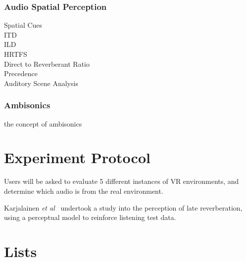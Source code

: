 \documentclass[paper=a4, fontsize=10pt, font=arial]{scrartcl} %
\numberwithin{equation}{section} %
\numberwithin{figure}{section} %
\numberwithin{table}{section} %
\begin{document}
\subsubsection{Audio Spatial Perception}

Spatial Cues\\
ITD\\

ILD\\

HRTFS\\

Direct to Reverberant Ratio\\

Precedence\\

Auditory Scene Analysis

\subsubsection{Ambisonics}

the concept of ambisonics\\


\section{Experiment Protocol}



Users will be asked to evaluate 5 different instances of VR environments, and determine which audio is from the real environment.

Karjalainen \textit{et al}~\cite{Karjalainen2001} undertook a study into the perception of late reverberation, using a perceptual model to reinforce listening test data.


\section{Lists}

\end{document}
